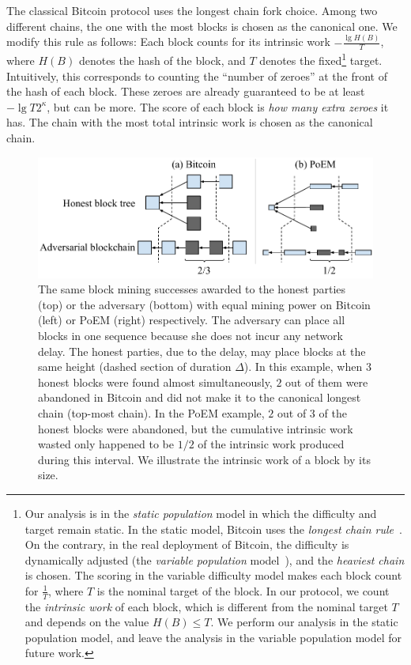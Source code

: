 \noindent
{}
The classical Bitcoin protocol uses the longest chain fork choice. Among two different
chains, the one with the most blocks is chosen as the canonical one. We modify this
rule as follows: Each block counts for its intrinsic work $-\frac{\lg H(B)}{T}$,
where $H(B)$ denotes the hash of the block, and $T$ denotes the fixed\footnote{Our
analysis is in the \emph{static population} model in which the difficulty
and target remain static. In the static model, Bitcoin uses the \emph{longest chain rule}~\cite{backbone}.
On the contrary, in the real deployment of Bitcoin, the difficulty is dynamically adjusted (the
\emph{variable population} model~\cite{varbackbone}), and the \emph{heaviest chain} is chosen.
The scoring in the variable difficulty model makes each block count for $\frac{1}{T}$, where
$T$ is the nominal target of the block. In our protocol, we count the \emph{intrinsic work}
of each block, which is different from the nominal target $T$ and depends on the value $H(B) \leq T$.
We perform our analysis in the static population model, and leave the analysis in the variable
population model for future work.} target. Intuitively, this corresponds to counting the
``number of zeroes'' at the front of the hash of each block. These zeroes are already guaranteed
to be at least $-\lg{T}{2^\kappa}$, but can be more. The score of each block is \emph{how many extra zeroes}
it has. The chain with the most total intrinsic work is chosen as the canonical chain.

\begin{figure}
  \centering
  \includegraphics[width=1\columnwidth,keepaspectratio]{figures/poem_work_wasted.pdf}
  \caption{The same block mining successes awarded to the honest parties (top) or the adversary (bottom)
           with equal mining power on Bitcoin (left) or PoEM (right) respectively. The adversary can place
           all blocks in one sequence because she does not incur any network delay. The honest parties,
           due to the delay, may place blocks at the same height (dashed section of duration $\Delta$).
           In this example, when $3$ honest blocks were found almost simultaneously, $2$ out of
           them were abandoned in Bitcoin and did not make it to the canonical longest chain
           (top-most chain).
           In the PoEM example, $2$ out of $3$ of the honest blocks were abandoned, but the cumulative intrinsic
           work wasted only happened to be $1/2$ of the intrinsic work produced during this interval.
           We illustrate the intrinsic work of a block by its size.}
  \label{fig:poem-wasted-work}
\end{figure}

